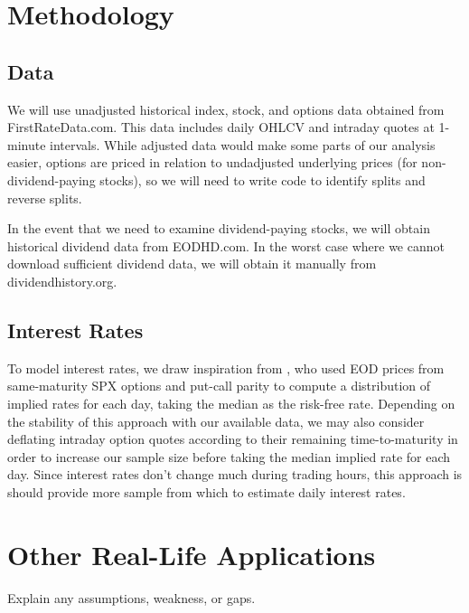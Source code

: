 \documentclass[final,3p,times,authoryear]{elsarticle}
\begin{document}
\section{Methodology}
  \label{methodology}
  
  \subsection{Data}
  \label{data}
    We will use unadjusted historical index, stock, and options data obtained from FirstRateData.com. This data includes daily OHLCV and intraday quotes at 1-minute intervals. While adjusted data would make some parts of our analysis easier, options are priced in relation to undadjusted underlying prices (for non-dividend-paying stocks), so we will need to write code to identify splits and reverse splits. 
    
    In the event that we need to examine dividend-paying stocks, we will obtain historical dividend data from EODHD.com. In the worst case where we cannot download sufficient dividend data, we will obtain it manually from dividendhistory.org.

  \subsection{Interest Rates}
  \label{interest-rates}
    To model interest rates, we draw inspiration from \citet{jackwerth_recovering_2000}, who used EOD prices from same-maturity SPX options and put-call parity to compute a distribution of implied rates for each day, taking the median as the risk-free rate. Depending on the stability of this approach with our available data, we may also consider deflating intraday option quotes according to their remaining time-to-maturity in order to increase our sample size before taking the median implied rate for each day. Since interest rates don't change much during trading hours, this approach is should provide more sample from which to estimate daily interest rates.

\section{Other Real-Life Applications}
  \label{applications}
  Explain any assumptions, weakness, or gaps.





 

\end{document}
